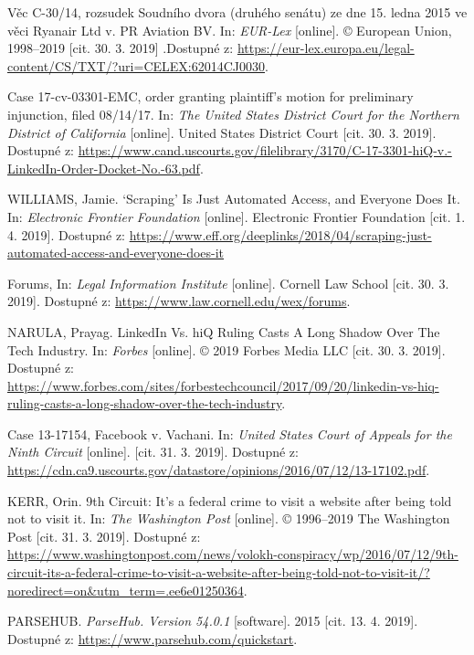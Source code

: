 \documentclass[thesis=B,czech]{FITthesis}[2012/06/26]
\begin{document}
\begin{thebibliography}{99}
	Věc C-30/14, rozsudek Soudního dvora (druhého senátu) ze dne 15. ledna 2015 ve věci Ryanair Ltd v. PR Aviation BV. In: \textit{EUR-Lex} [online]. © European Union, 1998--2019 [cit. 30. 3. 2019] .Dostupné z: \url{https://eur-lex.europa.eu/legal-content/CS/TXT/?uri=CELEX:62014CJ0030}.
	
	Case 17-cv-03301-EMC, order granting plaintiff's motion for preliminary injunction, filed 08/14/17. In: \textit{The United States District Court for the Northern District of California} [online]. United States District Court [cit. 30. 3. 2019]. Dostupné z: \url{https://www.cand.uscourts.gov/filelibrary/3170/C-17-3301-hiQ-v.-LinkedIn-Order-Docket-No.-63.pdf}.
	
	WILLIAMS, Jamie. ‘Scraping’ Is Just Automated Access, and Everyone Does It. In: \textit{Electronic Frontier Foundation} [online]. Electronic Frontier Foundation [cit. 1. 4. 2019]. Dostupné z: \url{https://www.eff.org/deeplinks/2018/04/scraping-just-automated-access-and-everyone-does-it}
	
	Forums, In: \textit{Legal Information Institute} [online]. Cornell Law School [cit. 30. 3. 2019]. Dostupné z: \url{https://www.law.cornell.edu/wex/forums}.
	
	NARULA, Prayag. LinkedIn Vs. hiQ Ruling Casts A Long Shadow Over The Tech Industry. In: \textit{Forbes} [online]. © 2019 Forbes Media LLC [cit. 30. 3. 2019]. Dostupné z: \url{https://www.forbes.com/sites/forbestechcouncil/2017/09/20/linkedin-vs-hiq-ruling-casts-a-long-shadow-over-the-tech-industry}.
	
	Case 13-17154, Facebook v. Vachani. In: \textit{United States Court of Appeals for the Ninth Circuit} [online]. [cit. 31. 3. 2019]. Dostupné z: \url{https://cdn.ca9.uscourts.gov/datastore/opinions/2016/07/12/13-17102.pdf}.
	
	KERR, Orin. 9th Circuit: It’s a federal crime to visit a website after being told not to visit it. In: \textit{The Washington Post} [online]. © 1996--2019 The Washington Post [cit. 31. 3. 2019]. Dostupné z: \url{https://www.washingtonpost.com/news/volokh-conspiracy/wp/2016/07/12/9th-circuit-its-a-federal-crime-to-visit-a-website-after-being-told-not-to-visit-it/?noredirect=on\&utm_term=.ee6e01250364}.
	
	PARSEHUB. \textit{ParseHub. Version 54.0.1} [software]. 2015 [cit. 13. 4. 2019]. Dostupné z: \url{https://www.parsehub.com/quickstart}.
	

\end{thebibliography}
\end{document}

